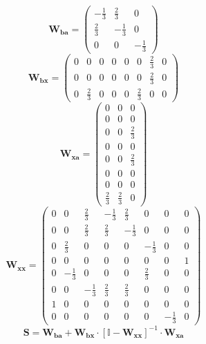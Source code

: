 \[ \mathbf{W_{ba}} = \left(\begin{array}{ccc} -\frac{1}{3} & \frac{2}{3} & 0 \\ \frac{2}{3} & -\frac{1}{3} & 0 \\ 0 & 0 & -\frac{1}{3} \end{array}\right) \]
\[ \mathbf{W_{bx}} = \left(\begin{array}{cccccccc} 0 & 0 & 0 & 0 & 0 & 0 & \frac{2}{3} & 0 \\ 0 & 0 & 0 & 0 & 0 & 0 & \frac{2}{3} & 0 \\ 0 & \frac{2}{3} & 0 & 0 & 0 & \frac{2}{3} & 0 & 0 \end{array}\right) \]
\[ \mathbf{W_{xa}} = \left(\begin{array}{ccc} 0 & 0 & 0 \\ 0 & 0 & 0 \\ 0 & 0 & \frac{2}{3} \\ 0 & 0 & 0 \\ 0 & 0 & \frac{2}{3} \\ 0 & 0 & 0 \\ 0 & 0 & 0 \\ \frac{2}{3} & \frac{2}{3} & 0 \end{array}\right) \]
\[ \mathbf{W_{xx}} = \left(\begin{array}{cccccccc} 0 & 0 & \frac{2}{3} & -\frac{1}{3} & \frac{2}{3} & 0 & 0 & 0 \\ 0 & 0 & \frac{2}{3} & \frac{2}{3} & -\frac{1}{3} & 0 & 0 & 0 \\ 0 & \frac{2}{3} & 0 & 0 & 0 & -\frac{1}{3} & 0 & 0 \\ 0 & 0 & 0 & 0 & 0 & 0 & 0 & 1 \\ 0 & -\frac{1}{3} & 0 & 0 & 0 & \frac{2}{3} & 0 & 0 \\ 0 & 0 & -\frac{1}{3} & \frac{2}{3} & \frac{2}{3} & 0 & 0 & 0 \\ 1 & 0 & 0 & 0 & 0 & 0 & 0 & 0 \\ 0 & 0 & 0 & 0 & 0 & 0 & -\frac{1}{3} & 0 \end{array}\right) \]
\[ \mathbf{S}=\mathbf{W_{ba}}+\mathbf{W_{bx}}\cdot\left[ \mathbb{I}  -\mathbf{W_{xx}}\right]^{-1}\cdot\mathbf{W_{xa}} \]
